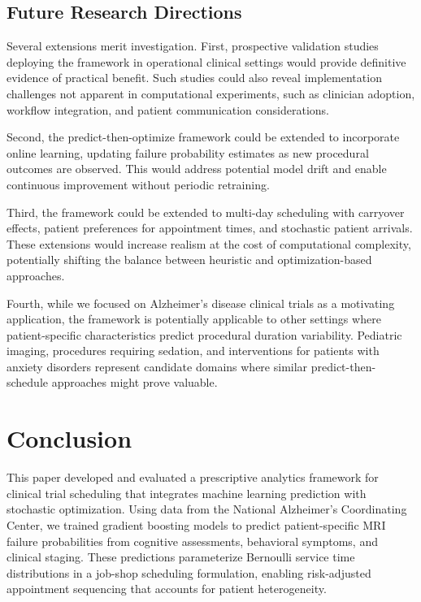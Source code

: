 \subsection{Future Research Directions}

Several extensions merit investigation. First, prospective validation studies deploying the framework in operational clinical settings would provide definitive evidence of practical benefit. Such studies could also reveal implementation challenges not apparent in computational experiments, such as clinician adoption, workflow integration, and patient communication considerations.

Second, the predict-then-optimize framework could be extended to incorporate online learning, updating failure probability estimates as new procedural outcomes are observed. This would address potential model drift and enable continuous improvement without periodic retraining.

Third, the framework could be extended to multi-day scheduling with carryover effects, patient preferences for appointment times, and stochastic patient arrivals. These extensions would increase realism at the cost of computational complexity, potentially shifting the balance between heuristic and optimization-based approaches.

Fourth, while we focused on Alzheimer's disease clinical trials as a motivating application, the framework is potentially applicable to other settings where patient-specific characteristics predict procedural duration variability. Pediatric imaging, procedures requiring sedation, and interventions for patients with anxiety disorders represent candidate domains where similar predict-then-schedule approaches might prove valuable.



\section{Conclusion}
\label{sec:conclusion}

This paper developed and evaluated a prescriptive analytics framework for clinical trial scheduling that integrates machine learning prediction with stochastic optimization. Using data from the National Alzheimer's Coordinating Center, we trained gradient boosting models to predict patient-specific MRI failure probabilities from cognitive assessments, behavioral symptoms, and clinical staging. These predictions parameterize Bernoulli service time distributions in a job-shop scheduling formulation, enabling risk-adjusted appointment sequencing that accounts for patient heterogeneity.

